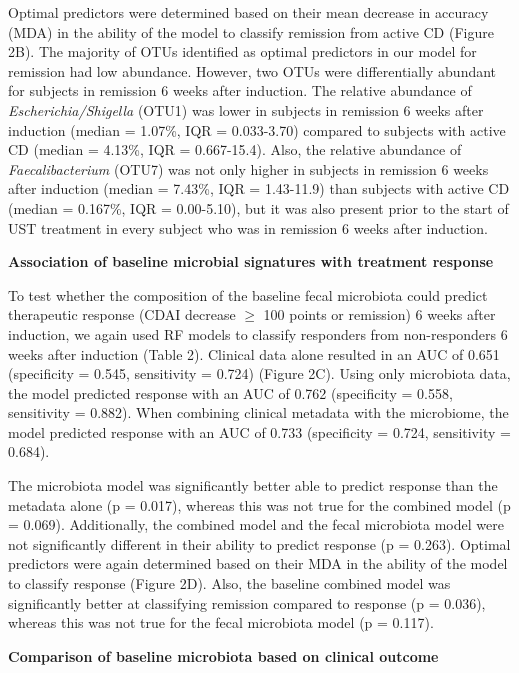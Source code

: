 \documentclass[12pt,]{article}
\begin{document}
Optimal predictors were determined based on their mean decrease in
accuracy (MDA) in the ability of the model to classify remission from
active CD (Figure 2B). The majority of OTUs identified as optimal
predictors in our model for remission had low abundance. However, two
OTUs were differentially abundant for subjects in remission 6 weeks
after induction. The relative abundance of \emph{Escherichia/Shigella}
(OTU1) was lower in subjects in remission 6 weeks after induction
(median = 1.07\%, IQR = 0.033-3.70) compared to subjects with active CD
(median = 4.13\%, IQR = 0.667-15.4). Also, the relative abundance of
\emph{Faecalibacterium} (OTU7) was not only higher in subjects in
remission 6 weeks after induction (median = 7.43\%, IQR = 1.43-11.9)
than subjects with active CD (median = 0.167\%, IQR = 0.00-5.10), but it
was also present prior to the start of UST treatment in every subject
who was in remission 6 weeks after induction.

\textbf{Association of baseline microbial signatures with treatment
response}

To test whether the composition of the baseline fecal microbiota could
predict therapeutic response (CDAI decrease \({\geq}\) 100 points or
remission) 6 weeks after induction, we again used RF models to classify
responders from non-responders 6 weeks after induction (Table 2).
Clinical data alone resulted in an AUC of 0.651 (specificity = 0.545,
sensitivity = 0.724) (Figure 2C). Using only microbiota data, the model
predicted response with an AUC of 0.762 (specificity = 0.558,
sensitivity = 0.882). When combining clinical metadata with the
microbiome, the model predicted response with an AUC of 0.733
(specificity = 0.724, sensitivity = 0.684).

The microbiota model was significantly better able to predict response
than the metadata alone (p = 0.017), whereas this was not true for the
combined model (p = 0.069). Additionally, the combined model and the
fecal microbiota model were not significantly different in their ability
to predict response (p = 0.263). Optimal predictors were again
determined based on their MDA in the ability of the model to classify
response (Figure 2D). Also, the baseline combined model was
significantly better at classifying remission compared to response (p =
0.036), whereas this was not true for the fecal microbiota model (p =
0.117).

\textbf{Comparison of baseline microbiota based on clinical outcome}
\end{document}
